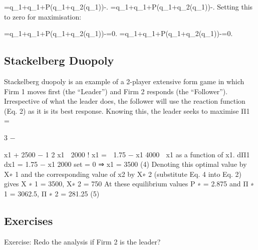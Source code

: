 {={}\cdot q_{1}+{}\cdot q_{1}+P(q_{1}+q_{2}(q_{1}))-{}.} {}={}\cdot q_{1}+{}\cdot q_{1}+P(q_{1}+q_{2}(q_{1}))-{}.
Setting this to zero for maximisation:

{={}\cdot q_{1}+{}\cdot q_{1}+P(q_{1}+q_{2}(q_{1}))-{}=0.} {}={}\cdot q_{1}+{}\cdot q_{1}+P(q_{1}+q_{2}(q_{1}))-{}=0.


\subsection{Stackelberg Duopoly}
Stackelberg duopoly is an example of a 2-player extensive form game in which Firm 1
moves first (the “Leader”) and Firm 2 responds (the “Follower”). Irrespective of what
the leader does, the follower will use the reaction function (Eq. 2) as it is its best response.
Knowing this, the leader seeks to maximise
Π1 =

3 −

x1 + 2500 −
1
2
x1

2000 !
x1 =

1.75 −
x1
4000

x1
as a function of x1.
dΠ1
dx1
= 1.75 −
x1
2000
set = 0
⇒ x1 = 3500 (4)
Denoting this optimal value by X∗
1
and the corresponding value of x2 by X∗
2
(substitute
Eq. 4 into Eq. 2) gives
X
∗
1 = 3500, X∗
2 = 750
At these equilibrium values
P
∗ = 2.875
and
Π
∗
1 = 3062.5, Π
∗
2 = 281.25 (5)

\subsection{Exercises}
Exercise: Redo the analysis if Firm 2 is the leader?
